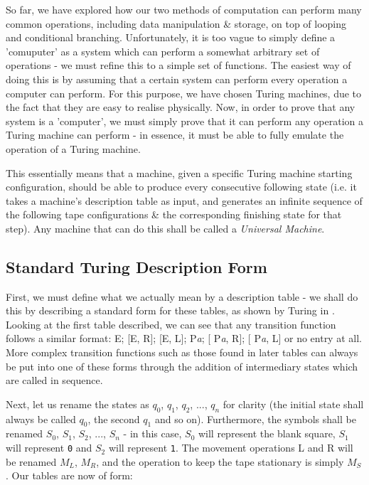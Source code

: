 \documentclass[Master.tex]{subfiles}
\begin{document}
\renewcommand{\arraystretch}{1.5}
So far, we have explored how our two methods of computation can perform many common operations, including data manipulation \& storage, on top of looping and conditional branching. Unfortunately, it is too vague to simply define a 'comuputer' as a system which can perform a somewhat arbitrary set of operations - we must refine this to a simple set of functions. The easiest way of doing this is by assuming that a certain system can perform every operation a computer can perform. For this purpose, we have chosen Turing machines, due to the fact that they are easy to realise physically. Now, in order to prove that any system is a 'computer', we must simply prove that it can perform any operation a Turing machine can perform - in essence, it must be able to fully emulate the operation of a Turing machine. 

 This essentially means that a machine, given a specific Turing machine starting configuration, should be able to produce every consecutive following state (i.e. it takes a machine's description table as input, and generates an infinite sequence of the following tape configurations \& the corresponding finishing state for that step). Any machine that can do this shall be called a \textit{Universal Machine}.

\subsection{Standard Turing Description Form}

First, we must define what we actually mean by a description table - we shall do this by describing a standard form for these tables, as shown by Turing in \cite{turing1936computablenumbers}. Looking at the first table described, we can see that any transition function follows a similar format: E; [E, R]; [E, L]; P\textit{a}; [ P\textit{a}, R]; [ P\textit{a}, L] or no entry at all. More complex transition functions such as those found in later tables can always be put into one of these forms through the addition of intermediary states which are called in sequence.

Next, let us rename the states as $q_0$, $q_1$, $q_2$, $...$, $q_n$ for clarity (the initial state shall always be called $q_0$, the second $q_1$ and so on). Furthermore, the symbols shall be renamed $S_0$, $S_1$, $S_2$, $...$, $S_n$ - in this case, $S_0$ will represent the blank square, $S_1$ will represent \texttt{0} and $S_2$ will represent \texttt{1}. The movement operations L and R will be renamed $M_L$, $M_R$, and the operation to keep the tape stationary is simply $M_S$. Our tables are now of form:
\end{document}
